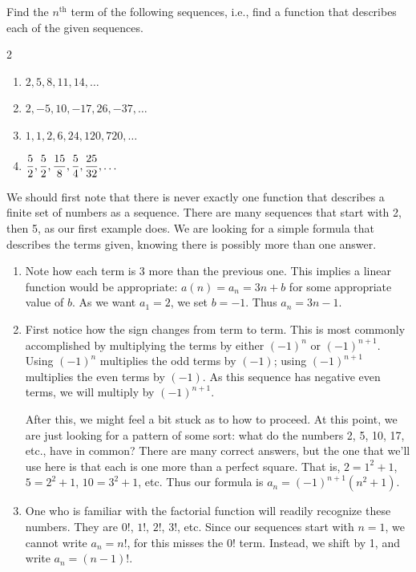 \begin{example}\label{ex_seq2}%
Find the $n^{\text{th}}$ term of the following sequences, i.e., find a function that describes each of the given sequences.
\begin{multicols}{2}
\begin{enumerate}
\item		$2, 5, 8, 11, 14, \dotsc$
\item		$2, -5, 10, -17, 26, -37, \dotsc$
\item		$1, 1, 2, 6, 24, 120, 720, \dotsc$
\item		$\displaystyle \frac52, \frac52, \frac{15}8, \frac54, \frac{25}{32}, \dotsc$
\end{enumerate}
\end{multicols}
\solution
We should first note that there is never exactly one function that describes a finite set of numbers as a sequence. There are many sequences that start with 2, then 5, as our first example does. We are looking for a simple formula that describes the terms given, knowing there is possibly more than one answer.
\begin{enumerate}
\item		Note how each term is 3 more than the previous one. This implies a linear function would be appropriate: $a(n) = a_n = 3n + b$ for some appropriate value of $b$. As we want $a_1=2$, we set $b=-1$. Thus $a_n = 3n-1$.

\item		First notice how the sign changes from term to term. This is most commonly accomplished by multiplying the terms by either $(-1)^n$ or $(-1)^{n+1}$. Using $(-1)^n$ multiplies the odd terms by $(-1)$; using $(-1)^{n+1}$ multiplies the even terms by $(-1)$. As this sequence has negative even terms, we will multiply by $(-1)^{n+1}$. 

After this, we might feel a bit stuck as to how to proceed. At this point, we are just looking for a pattern of some sort: what do the numbers 2, 5, 10, 17, etc., have in common? There are many correct answers, but the one that we'll use here is that each is one more than a perfect square. That is, $2=1^2+1$, $5=2^2+1$, $10=3^2+1$, etc. Thus our formula is $a_n= (-1)^{n+1}(n^2+1)$.

\item		One who is familiar with the factorial function will readily recognize these numbers. They are $0!$, $1!$, $2!$, $3!$, etc. Since our sequences start with $n=1$, we cannot write $a_n = n!$, for this misses the $0!$ term. Instead, we shift by 1, and write $a_n = (n-1)!$.


\end{enumerate}
\end{example}
